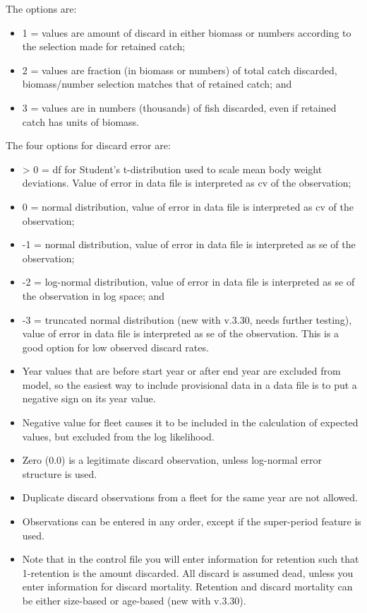 The options are:
\begin{itemize}
	\item 1 = values are amount of discard in either biomass or numbers according to the selection made for retained catch;
	\item 2 = values are fraction (in biomass or numbers) of total catch discarded, biomass/number selection matches that of retained catch; and
	\item 3 = values are in numbers (thousands) of fish discarded, even if retained catch has units of biomass.
\end{itemize}

The four options for discard error are:
\begin{itemize}
	\item > 0 = \gls{df} for Student's t-distribution used to scale mean body weight deviations. Value of error in data file is interpreted as \gls{cv} of the observation;
	\item 0 = normal distribution, value of error in data file is interpreted as \gls{cv} of the observation;
	\item -1 = normal distribution, value of error in data file is interpreted as \gls{se} of the observation;
	\item -2 = log-normal distribution, value of error in data file is interpreted as \gls{se} of the observation in log space; and 
	\item -3 = truncated normal distribution (new with v.3.30, needs further testing), value of error in data file is interpreted as \gls{se} of the observation. This is a good option for low observed discard rates.
\end{itemize}

\begin{itemize}
	\item Year values that are before start year or after end year are excluded from model, so the easiest way to include provisional data in a data file is to put a negative sign on its year value.
	\item Negative value for fleet causes it to be included in the calculation of expected values, but excluded from the log likelihood.
	\item Zero (0.0) is a legitimate discard observation, unless log-normal error structure is used.
	\item Duplicate discard observations from a fleet for the same year are not allowed.
	\item Observations can be entered in any order, except if the super-period feature is used. 
	\item Note that in the control file you will enter information for retention such that 1-retention is the amount discarded. All discard is assumed dead, unless you enter information for discard mortality. Retention and discard mortality can be either size-based or age-based (new with v.3.30).
\end{itemize}
	

